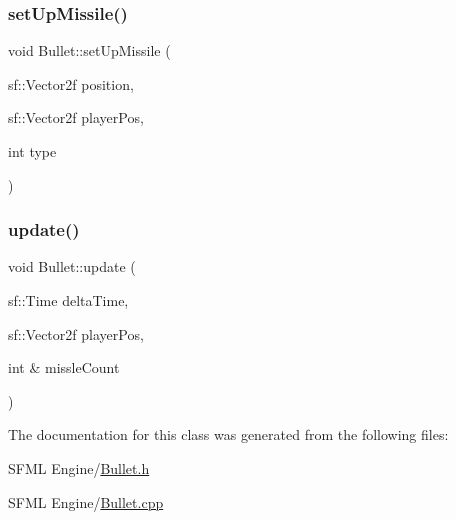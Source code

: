 \mbox{\label{class_bullet_a5ee57e44e79f829920f4c117937d5f97}} 
\subsubsection{\texorpdfstring{set\+Up\+Missile()}{setUpMissile()}}
{\footnotesize\ttfamily void Bullet\+::set\+Up\+Missile (\begin{DoxyParamCaption}\item[{sf\+::\+Vector2f}]{position,  }\item[{sf\+::\+Vector2f}]{player\+Pos,  }\item[{int}]{type }\end{DoxyParamCaption})}

\mbox{\label{class_bullet_ac1793d563983d2503cc562e0b3e1eee7}} 
\subsubsection{\texorpdfstring{update()}{update()}}
{\footnotesize\ttfamily void Bullet\+::update (\begin{DoxyParamCaption}\item[{sf\+::\+Time}]{delta\+Time,  }\item[{sf\+::\+Vector2f}]{player\+Pos,  }\item[{int \&}]{missle\+Count }\end{DoxyParamCaption})}



The documentation for this class was generated from the following files\+:\begin{DoxyCompactItemize}
\item 
S\+F\+M\+L Engine/\hyperlink{_bullet_8h}{Bullet.\+h}\item 
S\+F\+M\+L Engine/\hyperlink{_bullet_8cpp}{Bullet.\+cpp}\end{DoxyCompactItemize}

